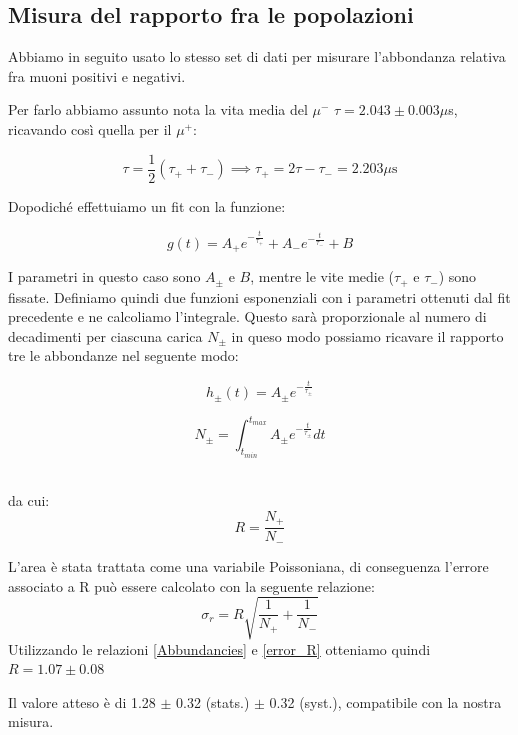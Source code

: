 \documentclass[10pt,a4paper]{article}
\begin{document}
\subsection{Misura del rapporto fra le popolazioni}
\begin{flushleft}
Abbiamo in seguito usato lo stesso set di dati per misurare l'abbondanza relativa fra muoni positivi e negativi. 

Per farlo abbiamo assunto nota la vita media del $\mu^{-}$ $\tau= 2.043\pm0.003 \mu$s, ricavando così quella per il $\mu^{+}$: 

\begin{equation}
    \label{mean_life_tot}
    \tau = \frac{1}{2}(\tau_{+}+\tau_{-}) \implies \tau_{+} = 2\tau -\tau_{-}= 2.203 \mu \text{s}
\end{equation}

Dopodiché effettuiamo un fit con la funzione:

\begin{equation}
    \label{fit_func_2}
    g(t) = A_{+}e^{-\frac{t}{\tau_+}}+A_{-}e^{-\frac{t}{\tau_-}} + B
\end{equation}

I parametri in questo caso sono $A_{\pm}$ e $B$, mentre le vite medie ($\tau_+$ e $\tau_-$) sono fissate. Definiamo quindi due funzioni esponenziali con i parametri ottenuti dal fit precedente e ne calcoliamo l'integrale. Questo sarà proporzionale al numero di decadimenti per ciascuna carica $N_{\pm}$ in queso modo possiamo ricavare il rapporto tre le abbondanze nel seguente modo:\\
\begin{minipage}{0.45\linewidth}
\centering
\begin{equation}
    \label{height_muon}
    h_{\pm}(t) = A_{\pm}e^{-\frac{t}{\tau_{\pm}}}
\end{equation}
\end{minipage}
\hfill
\begin{minipage}{0.45\linewidth}
\centering
\begin{equation}
    \label{Number_muon}
    N_{\pm} =\int _{t_{min}}^{t_{max}}  A_{\pm}e^{-\frac{t}{\tau_{\pm}}} dt
\end{equation}
\end{minipage}\\
da cui:
\begin{equation}
    \label{Abbundancies}
    R = \frac{N_+}{N_-}
\end{equation}


L'area è stata trattata come una variabile Poissoniana, di conseguenza l'errore associato a R può essere calcolato con la seguente relazione:
\begin{equation}
    \label{error_R}
    \sigma_r = R\sqrt{\frac{1}{N_+}+\frac{1}{N_-}}
\end{equation}
Utilizzando le relazioni \ref{Abbundancies} e \ref{error_R} otteniamo quindi $R = 1.07 \pm 0.08$

Il valore atteso è di 1.28 $\pm$ 0.32 (stats.) $\pm$ 0.32 (syst.), compatibile con la nostra misura.

\end{flushleft}
\end{document}
